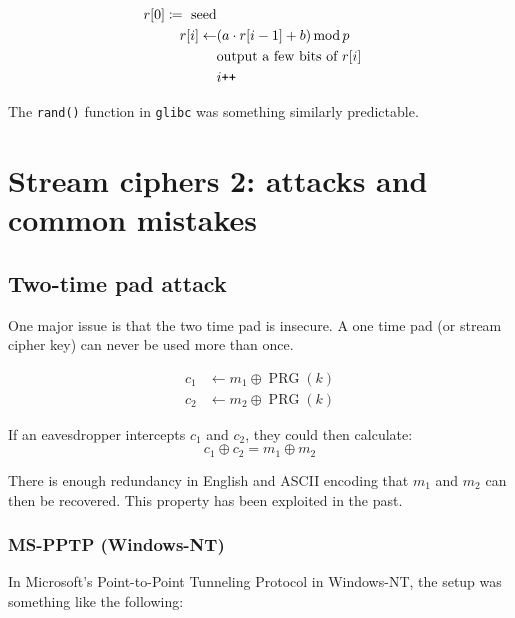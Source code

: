 \documentclass[10pt,a4paper]{report}
\begin{document}
\begin{equation*}
\begin{aligned}
    r[0] \coloneqq \text{ seed}\\
    r[i] \leftarrow & (a \cdot r[i-1] + b) \operatorname{mod} p\\
                    & \text{output a few bits of } r[i]\\
                    & i\verb!++!
\end{aligned}
\end{equation*}

The \verb!rand()! function in \verb!glibc! was something similarly predictable.

\section{Stream ciphers 2: attacks and common mistakes}

\subsection{Two-time pad attack}

One major issue is that the two time pad is insecure. A one time pad (or stream cipher key) can
never be used more than once.

\begin{equation*}
\begin{aligned}
    c_1 & \leftarrow m_1 \oplus \operatorname{PRG}(k)\\
    c_2 & \leftarrow m_2 \oplus \operatorname{PRG}(k)
\end{aligned}
\end{equation*}

If an eavesdropper intercepts $c_1$ and $c_2$, they could then calculate:
    $$ c_1 \oplus c_2 = m_1 \oplus m_2 $$

There is enough redundancy in English and ASCII encoding that $m_1$ and $m_2$ can then be
recovered. This property has been exploited in the past.

\subsubsection*{MS-PPTP (Windows-NT)}

In Microsoft's Point-to-Point Tunneling Protocol in Windows-NT, the setup was something like the
following:
\end{document}
